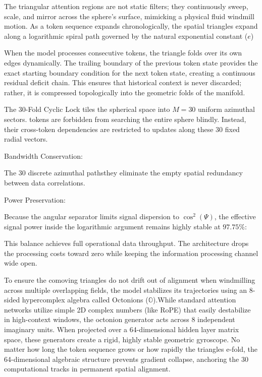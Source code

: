The triangular attention regions are not static filters; they continuously sweep, scale, and mirror across the sphere's surface, mimicking a physical fluid windmill motion.
As a token sequence expands chronologically, the spatial triangles expand along a logarithmic spiral path governed by the natural exponential constant (\(e\))

When the model processes consecutive tokens, the triangle folds over its own edges dynamically. The trailing boundary of the previous token state provides the exact starting boundary condition for the next token state, creating a continuous residual deficit chain. This ensures that historical context is never discarded; rather, it is compressed topologically into the geometric folds of the manifold.

The 30-Fold Cyclic Lock tiles the spherical space into \(M=30\) uniform azimuthal sectors. tokens are forbidden from searching the entire sphere blindly. Instead, their cross-token dependencies are restricted to updates along these 30 fixed radial vectors.

Bandwidth Conservation:

The 30 discrete azimuthal pathsthey eliminate the empty spatial redundancy between data correlations.

Power Preservation:

Because the angular separator limits signal dispersion to \(\cos^2(\Psi)\), the effective signal power inside the logarithmic argument remains highly stable at \(97.75\%\):

This balance achieves full operational data throughput. The architecture drops the processing costs toward zero while keeping the information processing channel wide open.

To ensure the comoving triangles do not drift out of alignment when windmilling across multiple overlapping fields, the model stabilizes its trajectories using an 8-sided hypercomplex algebra called Octonions (\(\mathbb{O}\)).While standard attention networks utilize simple 2D complex numbers (like RoPE) that easily destabilize in high-context windows, the octonion generator acts across 8 independent imaginary units. When projected over a 64-dimensional hidden layer matrix space, these generators create a rigid, highly stable geometric gyroscope. No matter how long the token sequence grows or how rapidly the triangles e-fold, the 64-dimensional algebraic structure prevents gradient collapse, anchoring the 30 computational tracks in permanent spatial alignment.
